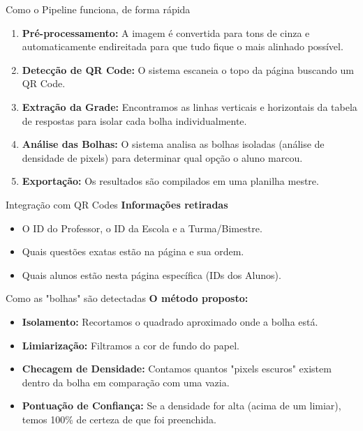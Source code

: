 \documentclass[aspectratio=169]{beamer}
\begin{document}
\begin{frame}{Como o Pipeline funciona, de forma rápida}
    \begin{enumerate}
        \item \textbf{Pré-processamento:} A imagem é convertida para tons de cinza e automaticamente endireitada para que tudo fique o mais alinhado possível.
        \item \textbf{Detecção de QR Code:} O sistema escaneia o topo da página buscando um QR Code.
        \item \textbf{Extração da Grade:} Encontramos as linhas verticais e horizontais da tabela de respostas para isolar cada bolha individualmente.
        \item \textbf{Análise das Bolhas:} O sistema analisa as bolhas isoladas (análise de densidade de pixels) para determinar qual opção o aluno marcou.
        \item \textbf{Exportação:} Os resultados são compilados em uma planilha mestre.
    \end{enumerate}
\end{frame}

\begin{frame}{Integração com QR Codes}    
    \vspace{0.5cm}
    \textbf{Informações retiradas}
    \begin{itemize}
        \item O ID do Professor, o ID da Escola e a Turma/Bimestre.
        \item Quais questões exatas estão na página e sua ordem.
        \item Quais alunos estão nesta página específica (IDs dos Alunos).
    \end{itemize}
\end{frame}

\begin{frame}{Como as "bolhas" são detectadas}    
    \vspace{0.3cm}
    \textbf{O método proposto:}
    \begin{itemize}
        \item \textbf{Isolamento:} Recortamos o quadrado aproximado onde a bolha está.
        \item \textbf{Limiarização:} Filtramos a cor de fundo do papel.
        \item \textbf{Checagem de Densidade:} Contamos quantos "pixels escuros" existem dentro da bolha em comparação com uma vazia.
        \item \textbf{Pontuação de Confiança:} Se a densidade for alta (acima de um limiar), temos 100\% de certeza de que foi preenchida.
    \end{itemize}
\end{frame}
\end{document}
